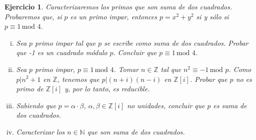 \documentclass[a4paper,11pt]{article}
\newcommand{\Zm}[1]{\ensuremath{\mathbb{Z}[#1]}}
\newcommand{\Cong}[3]{\ensuremath{#1 \equiv #2 \, \textrm{mod } #3}}
\newcommand{\Div}[2]{\ensuremath{#1 | #2}}
\newtheorem*{ej}{Ejercicio}
\begin{document}
\begin{ej} 
Caracterizaremos los primos que son suma de dos cuadrados. Probaremos que, si $p$ es un
primo impar, entonces $p = x^2 + y^2$ si y sólo si $\Cong{p}{1}{4}$.

\begin{enumerate}[i.]
    \item Sea $p$ primo impar tal que $p$ se escribe como suma de dos cuadrados.
    Probar que -1 es un cuadrado módulo $p$. Concluir que $\Cong{p}{1}{4}$.

    \item Sea $p$ primo impar, $\Cong{p}{1}{4}$. Tomar $n \in \mathbb{Z}$ tal que
    $\Cong{n^2}{-1}{p}$. Como $\Div{p}{n^2 + 1}$ en $\mathbb{Z}$, tenemos que
    $\Div{p}{(n + i)(n - i)}$ en \Zm{i}. Probar que $p$ no es primo de \Zm{i} y, 
    por lo tanto, es reducible.

    \item Sabiendo que $p = \alpha \cdot \beta$, $\alpha, \beta \in \Zm{i}$ no 
    unidades, concluir que $p$ es suma de dos cuadrados.

    \item Caracterizar los $n \in \mathbb{N}$ que son suma de dos cuadrados.
\end{enumerate}

\end{ej}
\end{document}
